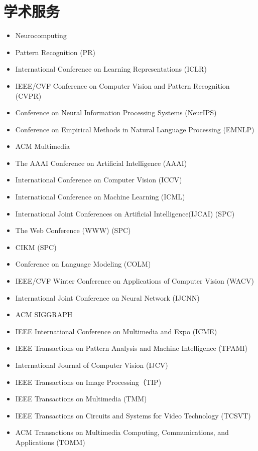 \section*{学术服务}
\begin{itemize}
\item Neurocomputing
\item Pattern Recognition (PR)
\item International Conference on Learning Representations (ICLR) 
\item IEEE/CVF Conference on Computer Vision and Pattern Recognition (CVPR) 
\item Conference on Neural Information Processing Systems (NeurIPS)
\item Conference on Empirical Methods in Natural Language Processing (EMNLP) 
\item ACM Multimedia 
\item The AAAI Conference on Artificial Intelligence (AAAI) 
\item International Conference on Computer Vision (ICCV) 
\item International Conference on Machine Learning (ICML) 
\item International Joint Conferences on Artificial Intelligence(IJCAI)   (SPC)
\item The Web Conference (WWW)  (SPC)
\item CIKM (SPC)
\item Conference on Language Modeling (COLM)
\item IEEE/CVF Winter Conference on Applications of Computer Vision (WACV) 
\item International Joint Conference on Neural Network (IJCNN) 
\item ACM SIGGRAPH
\item IEEE International Conference on Multimedia and Expo (ICME)
\item IEEE Transactions on Pattern Analysis and Machine Intelligence (TPAMI)
\item International Journal of Computer Vision (IJCV)
\item IEEE Transactions on Image Processing（TIP)
\item IEEE Transactions on Multimedia (TMM)
\item IEEE Transactions on Circuits and Systems for Video Technology (TCSVT)
\item ACM Transactions on Multimedia Computing, Communications, and Applications (TOMM)
\end{itemize}
